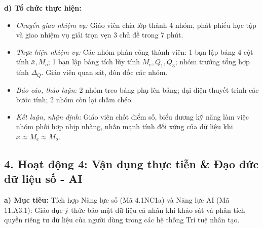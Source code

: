 \documentclass[12pt, a4paper]{article}
\begin{document}
\noindent \textbf{d) Tổ chức thực hiện:}
\begin{itemize}[leftmargin=0.8cm]
    \item \textit{Chuyển giao nhiệm vụ:} Giáo viên chia lớp thành 4 nhóm, phát phiếu học tập và giao nhiệm vụ giải trọn vẹn 3 chủ đề trong 7 phút.
    \item \textit{Thực hiện nhiệm vụ:} Các nhóm phân công thành viên: 1 bạn lập bảng 4 cột tính $\bar{x}, M_o$; 1 bạn lập bảng tích lũy tính $M_e, Q_1, Q_3$; nhóm trưởng tổng hợp tính $\Delta_Q$. Giáo viên quan sát, đôn đốc các nhóm.
    \item \textit{Báo cáo, thảo luận:} 2 nhóm treo bảng phụ lên bảng; đại diện thuyết trình các bước tính; 2 nhóm còn lại chấm chéo.
    \item \textit{Kết luận, nhận định:} Giáo viên chốt điểm số, biểu dương kỹ năng làm việc nhóm phối hợp nhịp nhàng, nhấn mạnh tính đối xứng của dữ liệu khi $\bar{x} \approx M_e \approx M_o$.
\end{itemize}

\subsection*{4. Hoạt động 4: Vận dụng thực tiễn \& Đạo đức dữ liệu số - AI}

\noindent \textbf{a) Mục tiêu:}
Tích hợp Năng lực số (Mã 4.1NC1a) và Năng lực AI (Mã 11.A3.1): Giáo dục ý thức bảo mật dữ liệu cá nhân khi khảo sát và phân tích quyền riêng tư dữ liệu của người dùng trong các hệ thống Trí tuệ nhân tạo.
\end{document}
